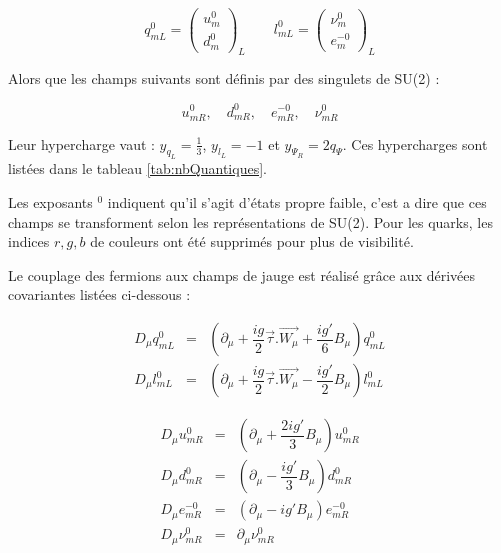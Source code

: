   \begin{equation} 
   q^0_{mL} = \begin{pmatrix} u^0_m\\ d^0_m \end{pmatrix}_L \qquad l^0_{mL} = \begin{pmatrix} \nu^0_m\\ e^{-0}_m \end{pmatrix}_L
  \end{equation}

  Alors que les champs suivants sont d\'efinis par des singulets de SU(2) :
  
  \begin{equation}
   u^0_{mR}, \quad d^0_{mR}, \quad e^{-0}_{mR}, \quad \nu^0_{mR}
  \end{equation}

  Leur hypercharge vaut : $y_{q_L} = \frac{1}{3}$, $y_{l_L} = -1$ et $y_{\Psi_R} = 2 q_\Psi$. Ces hypercharges sont list\'ees dans le tableau \ref{tab:nbQuantiques}.
  
  Les exposants $^0$ indiquent qu'il s'agit d'\'etats propre faible, c'est a dire que ces champs se transforment selon les repr\'esentations de SU(2). Pour les quarks, les indices $r,g,b$ de couleurs ont \'et\'e supprim\'es pour plus de visibilit\'e.

  \medskip
  
  Le couplage des fermions aux champs de jauge est r\'ealis\'e gr\^ace aux d\'eriv\'ees covariantes list\'ees ci-dessous :

  \begin{eqnarray}
   D_{\mu} q^0_{mL} & = & \left( \partial_{\mu} + \dfrac{ig}{2} \overrightarrow{\tau}.\overrightarrow{W_{\mu}} + \dfrac{ig'}{6} B_{\mu} \right) q^0_{mL} \\ \nonumber
   D_{\mu} l^0_{mL} & = & \left( \partial_{\mu} + \dfrac{ig}{2} \overrightarrow{\tau}.\overrightarrow{W_{\mu}} - \dfrac{ig'}{2} B_{\mu} \right) l^0_{mL}
  \end{eqnarray}

  \begin{eqnarray}
   D_{\mu} u^0_{mR} & = & \left( \partial_{\mu} + \dfrac{2ig'}{3} B_{\mu} \right) u^0_{mR} \\ \nonumber
   D_{\mu} d^0_{mR} & = & \left( \partial_{\mu} - \dfrac{ig'}{3} B_{\mu} \right) d^0_{mR}  \\ \nonumber
   D_{\mu} e^{-0}_{mR} & = & \left( \partial_{\mu} - ig' B_{\mu} \right) e^{-0}_{mR}  \\ \nonumber
   D_{\mu} \nu^{0}_{mR} & = & \partial_{\mu} \nu^{0}_{mR}  \\ \nonumber
  \end{eqnarray}
  

